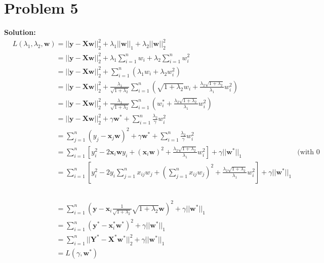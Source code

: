 \documentclass[11pt]{article}
\begin{document}
\section*{Problem 5}
\textbf{Solution:}
\begin{align}
	&L(\lambda_1, \lambda_2, \mathbf{w}) = ||\mathbf{y} - \mathbf{Xw}||^2_2 + \lambda_1||\mathbf{w}||_1 + \lambda_2||\mathbf{w}||_2^2\nonumber\\
	&\phantom{L(\lambda_1, \lambda_2, \mathbf{w})} = ||\mathbf{y} - \mathbf{Xw}||^2_2 + \lambda_1\sum_{i = 1}^n w_i + \lambda_2 \sum_{i = 1}^n w_i^2\nonumber\\
	&\phantom{L(\lambda_1, \lambda_2, \mathbf{w})} = ||\mathbf{y} - \mathbf{Xw}||^2_2 + \sum_{i = 1}^n (\lambda_1w_i + \lambda_2w_i^2) \nonumber\\
	&\phantom{L(\lambda_1, \lambda_2, \mathbf{w})} = ||\mathbf{y} - \mathbf{Xw}||^2_2 + \frac{\lambda_1}{\sqrt{1 + \lambda_2}}\sum_{i = 1}^n (\sqrt{1 + \lambda_2}w_i + \frac{\lambda_2\sqrt{1 + \lambda_2}}{\lambda_1}w_i^2) \nonumber\\
	&\phantom{L(\lambda_1, \lambda_2, \mathbf{w})} = ||\mathbf{y} - \mathbf{Xw}||^2_2 + \frac{\lambda_1}{\sqrt{1 + \lambda_2}}\sum_{i = 1}^n (w_i^* + \frac{\lambda_2\sqrt{1 + \lambda_2}}{\lambda_1}w_i^2) \nonumber\\
	&\phantom{L(\lambda_1, \lambda_2, \mathbf{w})} = ||\mathbf{y} - \mathbf{Xw}||^2_2 + \gamma \mathbf{w}^* + \sum_{i = 1}^n\frac{\lambda_2}{\gamma}w_i^2 \nonumber\\
	&\phantom{L(\lambda_1, \lambda_2, \mathbf{w})} = \sum_{j = 1}^n (y_j - \mathbf{x}_j\mathbf{w})^2 + \gamma \mathbf{w}^* + \sum_{i = 1}^n\frac{\lambda_2}{\gamma}w_i^2 \nonumber\\
	&\phantom{L(\lambda_1, \lambda_2, \mathbf{w})} = \sum_{i = 1}^n \left[y_i^2 - 2\mathbf{x}_i\mathbf{w}y_i + (\mathbf{x}_i\mathbf{w})^2 + \frac{\lambda_2\sqrt{1 + \lambda_2}}{\lambda_1}w_i^2\right] + \gamma ||\mathbf{w}^*||_1  & \text{(with 0 paddings)}\nonumber\\
	&\phantom{L(\lambda_1, \lambda_2, \mathbf{w})} = \sum_{i = 1}^n \left[y_i^2 - 2y_i\sum_{j = 1}^n x_{ij}w_j + (\sum_{j = 1}^n x_{ij}w_j)^2 + \frac{\lambda_2\sqrt{1 + \lambda_2}}{\lambda_1}w_i^2\right] + \gamma ||\mathbf{w}^*||_1 \nonumber\\
	&\phantom{L(\lambda_1, \lambda_2, \mathbf{w}) = ||\mathbf{y} - \mathbf{Xw}||^2_2 + \lambda_1||\mathbf{w}||_1 + \lambda_2||\mathbf{w}||_2^2}\nonumber\\
	&\phantom{L(\lambda_1, \lambda_2, \mathbf{w})} = \sum_{i = 1}^n (\mathbf{y} - \mathbf{x}_i\frac{1}{\sqrt{1 + \lambda_2}}\sqrt{1 + \lambda_2}\mathbf{w})^2 + \gamma ||\mathbf{w}^*||_1 \nonumber\\
	&\phantom{L(\lambda_1, \lambda_2, \mathbf{w})} = \sum_{i = 1}^n (\mathbf{y}^* - \mathbf{x}_i^*\mathbf{w}^*)^2 + \gamma ||\mathbf{w}^*||_1 \nonumber\\
	&\phantom{L(\lambda_1, \lambda_2, \mathbf{w})} = \sum_{i = 1}^n ||\mathbf{Y}^* - \mathbf{X}^*\mathbf{w}^*||_2^2 + \gamma ||\mathbf{w}^*||_1 \nonumber\\
	&\phantom{L(\lambda_1, \lambda_2, \mathbf{w})} = L(\gamma, \mathbf{w}^*)\nonumber
\end{align}
\end{document}
